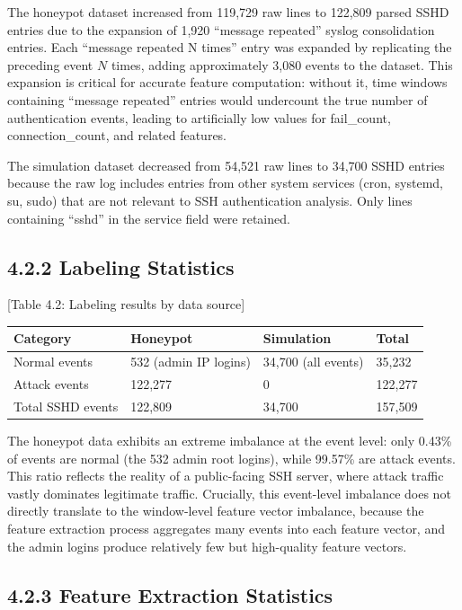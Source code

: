 \documentclass[
  a4paper]{report}
\newcounter{none} %
\begin{document}
The honeypot dataset increased from 119,729 raw lines to 122,809 parsed
SSHD entries due to the expansion of 1,920 ``message repeated'' syslog
consolidation entries. Each ``message repeated N times'' entry was
expanded by replicating the preceding event \(N\) times, adding
approximately 3,080 events to the dataset. This expansion is critical
for accurate feature computation: without it, time windows containing
``message repeated'' entries would undercount the true number of
authentication events, leading to artificially low values for
fail\_count, connection\_count, and related features.

The simulation dataset decreased from 54,521 raw lines to 34,700 SSHD
entries because the raw log includes entries from other system services
(cron, systemd, su, sudo) that are not relevant to SSH authentication
analysis. Only lines containing ``sshd'' in the service field were
retained.

\subsection{4.2.2 Labeling Statistics}\label{labeling-statistics}

{[}Table 4.2: Labeling results by data source{]}

{\def\LTcaptype{none} %
\begin{longtable}[]{@{}llll@{}}
\toprule\noalign{}
Category & Honeypot & Simulation & Total \\
\midrule\noalign{}
\endhead
\bottomrule\noalign{}
\endlastfoot
Normal events & 532 (admin IP logins) & 34,700 (all events) & 35,232 \\
Attack events & 122,277 & 0 & 122,277 \\
Total SSHD events & 122,809 & 34,700 & 157,509 \\
\end{longtable}
}

The honeypot data exhibits an extreme imbalance at the event level: only
0.43\% of events are normal (the 532 admin root logins), while 99.57\%
are attack events. This ratio reflects the reality of a public-facing
SSH server, where attack traffic vastly dominates legitimate traffic.
Crucially, this event-level imbalance does not directly translate to the
window-level feature vector imbalance, because the feature extraction
process aggregates many events into each feature vector, and the admin
logins produce relatively few but high-quality feature vectors.

\subsection{4.2.3 Feature Extraction
Statistics}\label{feature-extraction-statistics}
\end{document}
